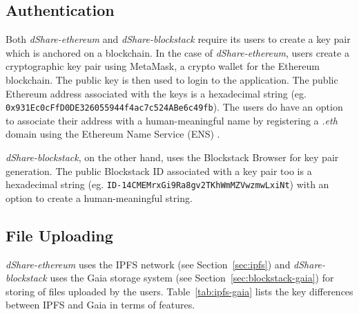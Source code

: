 		\subsection{Authentication}
			Both \textit{dShare-ethereum} and \textit{dShare-blockstack} require its users to create a key pair which is anchored on a blockchain. In the case of \textit{dShare-ethereum}, users create a cryptographic key pair using MetaMask, a crypto wallet for the Ethereum blockchain. The public key is then used to login to the application. The public Ethereum address associated with the keys is a hexadecimal string (eg. \texttt{0x931Ec0cFfD0DE326055944f4ac7c524ABe6c49fb}). The users do have an option to associate their address with a human-meaningful name by registering a \textit{.eth} domain using the Ethereum Name Service (ENS) \cite{github:eip:137}.
			
			\textit{dShare-blockstack}, on the other hand, uses the Blockstack Browser \cite{github:bb:1} for key pair generation. The public Blockstack ID\cite{doc:blockid:2} associated with a key pair too is a hexadecimal string (eg. \texttt{ID-14CMEMrxGi9Ra8gv2TKhWmMZVwzmwLxiNt}) with an option to create a human-meaningful string.
			
		\subsection{File Uploading}
			\textit{dShare-ethereum} uses the IPFS\cite{benet2014ipfs} network (see Section~\ref{sec:ipfs}) and \textit{dShare-blockstack} uses the Gaia storage system (see Section~\ref{sec:blockstack-gaia}) for storing of files uploaded by the users. Table~\ref{tab:ipfs-gaia} lists the key differences between IPFS and Gaia in terms of features.
		
